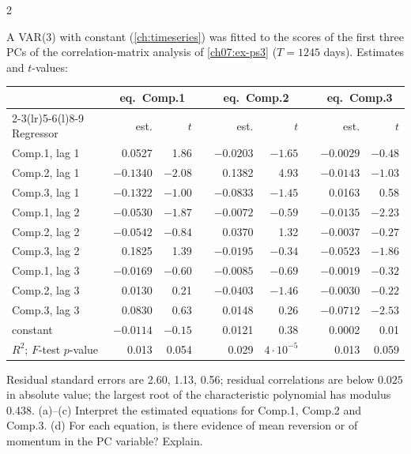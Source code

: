\begin{paracol}{2}
\begin{exercise}\label{ch07:ex-ps7-4}
A VAR(3) with constant (\cref{ch:timeseries}) was fitted to the scores of the first three PCs of the
correlation-matrix analysis of \cref{ch07:ex-ps3} ($T=1245$ days). Estimates and $t$-values:
\begin{center}\small
\begin{tabular}{@{}l rr c rr c rr@{}}
\toprule
 & \multicolumn{2}{c}{eq.\ Comp.1} & & \multicolumn{2}{c}{eq.\ Comp.2} & & \multicolumn{2}{c}{eq.\ Comp.3}\\
\cmidrule(lr){2-3}\cmidrule(lr){5-6}\cmidrule(l){8-9}
Regressor & est. & $t$ & & est. & $t$ & & est. & $t$\\
\midrule
Comp.1, lag 1 & 0.0527 & 1.86 & & $-0.0203$ & $-1.65$ & & $-0.0029$ & $-0.48$\\
Comp.2, lag 1 & $-0.1340$ & $-2.08$ & & 0.1382 & 4.93 & & $-0.0143$ & $-1.03$\\
Comp.3, lag 1 & $-0.1322$ & $-1.00$ & & $-0.0833$ & $-1.45$ & & 0.0163 & 0.58\\
Comp.1, lag 2 & $-0.0530$ & $-1.87$ & & $-0.0072$ & $-0.59$ & & $-0.0135$ & $-2.23$\\
Comp.2, lag 2 & $-0.0542$ & $-0.84$ & & 0.0370 & 1.32 & & $-0.0037$ & $-0.27$\\
Comp.3, lag 2 & 0.1825 & 1.39 & & $-0.0195$ & $-0.34$ & & $-0.0523$ & $-1.86$\\
Comp.1, lag 3 & $-0.0169$ & $-0.60$ & & $-0.0085$ & $-0.69$ & & $-0.0019$ & $-0.32$\\
Comp.2, lag 3 & 0.0130 & 0.21 & & $-0.0403$ & $-1.46$ & & $-0.0030$ & $-0.22$\\
Comp.3, lag 3 & 0.0830 & 0.63 & & 0.0148 & 0.26 & & $-0.0712$ & $-2.53$\\
constant & $-0.0114$ & $-0.15$ & & 0.0121 & 0.38 & & 0.0002 & 0.01\\
\midrule
$R^2$; $F$-test $p$-value & 0.013 & 0.054 & & 0.029 & $4\cdot10^{-5}$ & & 0.013 & 0.059\\
\bottomrule
\end{tabular}
\end{center}
Residual standard errors are 2.60, 1.13, 0.56; residual correlations are below $0.025$ in absolute value; the
largest root of the characteristic polynomial has modulus 0.438.
(a)--(c) Interpret the estimated equations for Comp.1, Comp.2 and Comp.3.
(d) For each equation, is there evidence of mean reversion or of momentum in the PC variable? Explain.
\end{exercise}


\end{paracol}
